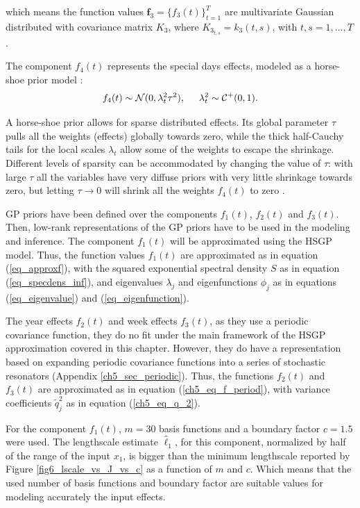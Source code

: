 \documentclass[onecolumn,a4paper,11pt]{article}
\begin{document}
\noindent which means the function values $\bm{f}_3=\{f_3(t)\}_{t=1}^T$ are multivariate Gaussian distributed with covariance matrix $K_3$, where $K_{3_{t,s}}=k_3(t,s)$, with $t,s=1,\dots,T$.

The component $f_4(t)$ represents the special days effects, modeled as a horse-shoe prior model \citep{piironen2017sparsity}:
%
\begin{eqnarray*}
f_4(t) \sim \mathcal{N}(0,\lambda^2_t \tau^2), \hspace{5mm} \lambda^2_t \sim \mathcal{C}^{+}(0,1).
\end{eqnarray*}

\noindent A horse-shoe prior allows for sparse distributed effects. Its global parameter $\tau$ pulls all the weights (effects) globally towards zero, while the thick half-Cauchy tails for the local scales $\lambda_t$ allow some of the weights to escape the shrinkage. Different levels of sparsity can be accommodated by changing the value of $\tau$: with large $\tau$ all the variables have very diffuse priors with very little shrinkage towards zero, but letting $\tau \rightarrow 0$ will shrink all the weights $f_4(t)$ to zero \citep{piironen2016hyperprior}. 

GP priors have been defined over the components $f_1(t)$, $f_2(t)$ and $f_3(t)$. Then, low-rank representations of the GP priors have to be used in the modeling and inference. The component $f_1(t)$ will be approximated using the HSGP model. Thus, the function values $f_1(t)$ are approximated as in equation (\ref{eq_approxf}), with the squared exponential spectral density $S$ as in equation (\ref{eq_specdens_inf}), and eigenvalues $\lambda_j$  and eigenfunctions $\phi_j$ as in equations (\ref{eq_eigenvalue}) and (\ref{eq_eigenfunction}). 

The year effects $f_2(t)$ and week effects $f_3(t)$, as they use a periodic covariance function, they do no fit under the main framework of the HSGP approximation covered in this chapter. However, they do have a representation based on expanding periodic covariance functions into a series of stochastic resonators (Appendix \ref{ch5_sec_periodic}). Thus, the functions $f_2(t)$ and $f_3(t)$ are approximated as in equation (\ref{ch5_eq_f_period}), with variance coefficients $\tilde{q}_j^2$ as in equation (\ref{ch5_eq_q_2}).

For the component $f_1(t)$, $m=30$ basis functions and a boundary factor $c=1.5$ were used. The lengthscale estimate $\hat{\ell}_1$, for this component, normalized by half of the range of the input $x_1$, is bigger than the minimum lengthscale reported by Figure \ref{fig6_lscale_vs_J_vs_c} as a function of $m$ and $c$. Which means that the used number of basis functions and boundary factor are suitable values for modeling accurately the input effects. 
\end{document}
